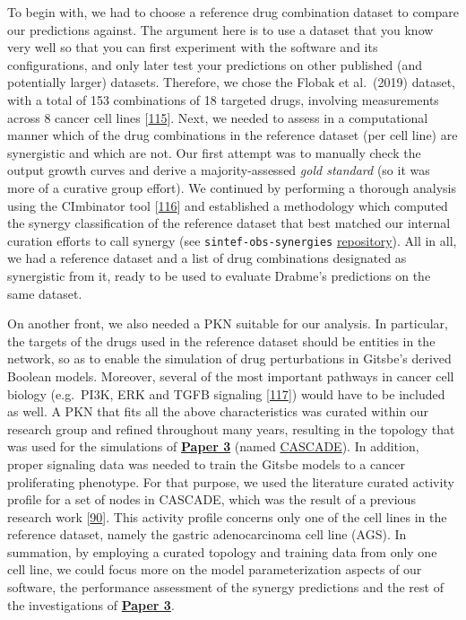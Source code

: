 \documentclass[
  12pt,
]{book}
\begin{document}
To begin with, we had to choose a reference drug combination dataset to compare our predictions against.
The argument here is to use a dataset that you know very well so that you can first experiment with the software and its configurations, and only later test your predictions on other published (and potentially larger) datasets.
Therefore, we chose the Flobak et al.~(2019) dataset, with a total of 153 combinations of 18 targeted drugs, involving measurements across 8 cancer cell lines {[}\protect\hyperlink{ref-Flobak2019}{115}{]}.
Next, we needed to assess in a computational manner which of the drug combinations in the reference dataset (per cell line) are synergistic and which are not.
Our first attempt was to manually check the output growth curves and derive a majority-assessed \emph{gold standard} (so it was more of a curative group effort).
We continued by performing a thorough analysis using the CImbinator tool {[}\protect\hyperlink{ref-Flobak2017}{116}{]} and established a methodology which computed the synergy classification of the reference dataset that best matched our internal curation efforts to call synergy (see \texttt{sintef-obs-synergies} \protect\hyperlink{misc-links}{repository}).
All in all, we had a reference dataset and a list of drug combinations designated as synergistic from it, ready to be used to evaluate Drabme's predictions on the same dataset.

On another front, we also needed a PKN suitable for our analysis.
In particular, the targets of the drugs used in the reference dataset should be entities in the network, so as to enable the simulation of drug perturbations in Gitsbe's derived Boolean models.
Moreover, several of the most important pathways in cancer cell biology (e.g.~PI3K, ERK and TGFB signaling {[}\protect\hyperlink{ref-kegg-cancer}{117}{]}) would have to be included as well.
A PKN that fits all the above characteristics was curated within our research group and refined throughout many years, resulting in the topology that was used for the simulations of \textbf{\protect\hyperlink{Paper3}{Paper 3}} (named \protect\hyperlink{misc-links}{CASCADE}).
In addition, proper signaling data was needed to train the Gitsbe models to a cancer proliferating phenotype.
For that purpose, we used the literature curated activity profile for a set of nodes in CASCADE, which was the result of a previous research work {[}\protect\hyperlink{ref-Flobak2015}{90}{]}.
This activity profile concerns only one of the cell lines in the reference dataset, namely the gastric adenocarcinoma cell line (AGS).
In summation, by employing a curated topology and training data from only one cell line, we could focus more on the model parameterization aspects of our software, the performance assessment of the synergy predictions and the rest of the investigations of \textbf{\protect\hyperlink{Paper3}{Paper 3}}.
\end{document}
